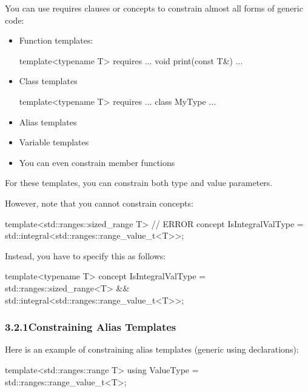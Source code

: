 

You can use requires clauses or concepts to constrain almost all forms of generic code:

\begin{itemize}
\item
Function templates:
\begin{cpp}
template<typename T>
requires ...
void print(const T&) {
	...
}
\end{cpp}

\item
Class templates
\begin{cpp}
template<typename T>
requires ...
class MyType {
	...
}
\end{cpp}

\item
Alias templates

\item
Variable templates

\item
You can even constrain member functions
\end{itemize}

For these templates, you can constrain both type and value parameters.

However, note that you cannot constrain concepts:

\begin{cpp}
template<std::ranges::sized_range T> // ERROR
concept IsIntegralValType = std::integral<std::ranges::range_value_t<T>>;
\end{cpp}

Instead, you have to specify this as follows:

\begin{cpp}
template<typename T>
concept IsIntegralValType = std::ranges::sized_range<T> &&
							std::integral<std::ranges::range_value_t<T>>;
\end{cpp}


\subsubsection*{ 3.2.1\hspace{0.2cm}Constraining Alias Templates}

Here is an example of constraining alias templates (generic using declarations):

\begin{cpp}
template<std::ranges::range T>
using ValueType = std::ranges::range_value_t<T>;
\end{cpp}

